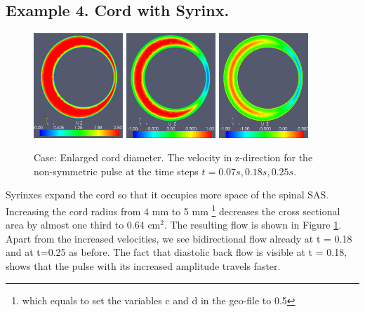 \subsection{Example 4. Cord with Syrinx.} 
\begin{figure}\begin{center}
\includegraphics[width=0.3\textwidth]{chapters/hentschel/eps/pulse_syrinx_f1_08_syrinx05_sysmax_nmb7.eps}
\includegraphics[width=0.3\textwidth]{chapters/hentschel/eps/pulse_syrinx_f1_08_syrinx05_sysdia_nmb18.eps}
\includegraphics[width=0.3\textwidth]{chapters/hentschel/eps/pulse_syrinx_f1_08_syrinx05_diamin1_nmb25.eps}
\caption{Case: Enlarged cord diameter. The velocity in z-direction for the non-symmetric pulse at the time steps $t=0.07s, 0.18s, 0.25s$.}
\label{fig:case4}
\end{center}\end{figure}

Syrinxes expand the cord so that it occupies more space of the spinal SAS. Increasing the cord radius from 4 mm to 5 mm \footnote{which equals to set the variables c and d in the geo-file to 0.5} decreases the cross sectional area by almost one third to 0.64 $\mathrm{cm^2}$. The resulting flow is shown in Figure \ref{fig:case4}. Apart from the increased velocities, we see bidirectional flow already at t = 0.18 and at t=0.25 as before. The fact that diastolic back flow is visible at t = 0.18, shows that the pulse with its increased amplitude travels faster. 

